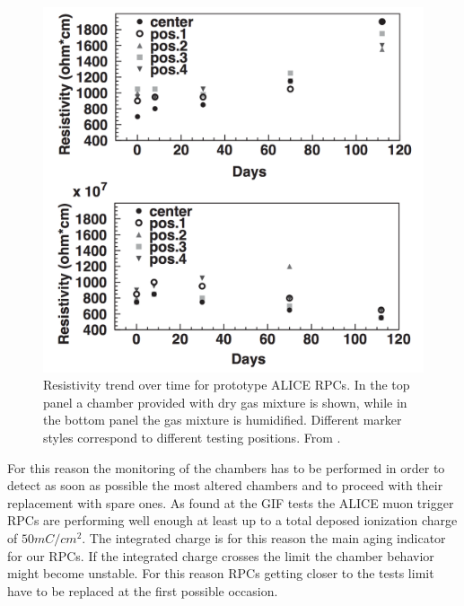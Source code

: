 \begin{figure}[!t]
\begin{center}
\includegraphics[width=0.95\linewidth]{Chapters/Performance/Figs/dry_vs_wet.png}
\caption{Resistivity trend over time for prototype ALICE RPCs. In the top panel a chamber provided with dry gas mixture is shown, while in the bottom panel the gas mixture is humidified. Different marker styles correspond to different testing positions. From \cite{aliceRPC:2004}.}
\label{fig:drywet}
\end{center}
\end{figure}



For this reason the monitoring of the chambers has to be performed in order to detect as soon as possible the most altered chambers and to proceed with their replacement with spare ones.
As found at the GIF tests the ALICE muon trigger RPCs are performing well enough at least up to a total deposed ionization charge of $50mC/cm^2$.
The integrated charge is for this reason the main aging indicator for our RPCs.
If the integrated charge crosses the limit the chamber behavior might become unstable.
For this reason RPCs getting closer to the tests limit have to be replaced at the first possible occasion.

